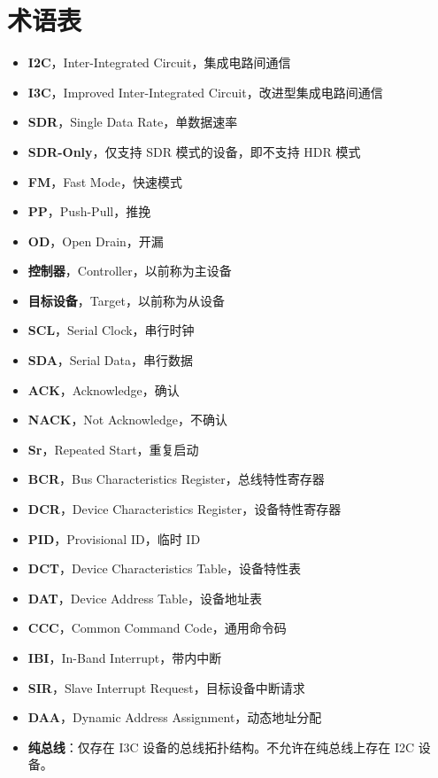 \documentclass[main\_\_CN.tex]{subfiles}
\begin{document}
\section{术语表}
\setlength{\itemsep}{3pt}
\begin{itemize}
    \item \textbf{I2C}，Inter-Integrated Circuit，集成电路间通信
    \item \textbf{I3C}，Improved Inter-Integrated Circuit，改进型集成电路间通信
    \item \textbf{SDR}，Single Data Rate，单数据速率
    \item \textbf{SDR-Only}，仅支持 SDR 模式的设备，即不支持 HDR 模式
    \item \textbf{FM}，Fast Mode，快速模式
    \item \textbf{PP}，Push-Pull，推挽
    \item \textbf{OD}，Open Drain，开漏
    \item \textbf{控制器}，Controller，以前称为主设备
    \item \textbf{目标设备}，Target，以前称为从设备
    \item \textbf{SCL}，Serial Clock，串行时钟
    \item \textbf{SDA}，Serial Data，串行数据
    \item \textbf{ACK}，Acknowledge，确认
    \item \textbf{NACK}，Not Acknowledge，不确认
    \item \textbf{Sr}，Repeated Start，重复启动
    \item \textbf{BCR}，Bus Characteristics Register，总线特性寄存器
    \item \textbf{DCR}，Device Characteristics Register，设备特性寄存器
    \item \textbf{PID}，Provisional ID，临时 ID
    \item \textbf{DCT}，Device Characteristics Table，设备特性表
    \item \textbf{DAT}，Device Address Table，设备地址表
    \item \textbf{CCC}，Common Command Code，通用命令码
    \item \textbf{IBI}，In-Band Interrupt，带内中断
    \item \textbf{SIR}，Slave Interrupt Request，目标设备中断请求
    \item \textbf{DAA}，Dynamic Address Assignment，动态地址分配
    \item \textbf{纯总线}：仅存在 I3C 设备的总线拓扑结构。不允许在纯总线上存在 I2C 设备。
\end{itemize}
\end{document}
